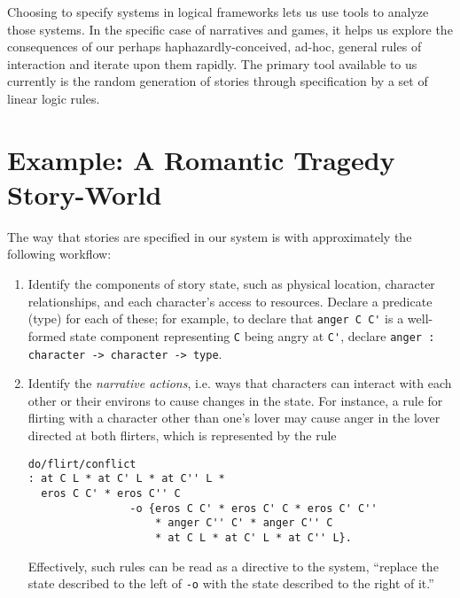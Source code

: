 \documentclass[letterpaper]{article}
\begin{document}
Choosing to specify systems in logical frameworks lets us use tools to
analyze those systems. In the specific case of narratives and games, it
helps us explore the consequences of our perhaps haphazardly-conceived,
ad-hoc, general rules of interaction and iterate upon them rapidly. The
primary tool available to us currently is the random generation of stories
through specification by a set of linear logic rules.


\section{Example: A Romantic Tragedy Story-World}

% 

The way that stories are specified in our system is with approximately the
following workflow:
\begin{enumerate}
\item Identify the components of story state, such as physical location,
character relationships, and each character's access to resources. Declare
a predicate (type) for each of these; for example, to declare that
\verb|anger C C'| is a well-formed state component representing \verb|C|
being angry at \verb|C'|, declare  
\verb|anger : character -> character -> type|.
\item Identify the {\em narrative actions}, i.e. ways that characters can
interact with each other or their environs to cause changes in the state.
For instance, a rule for flirting with a character other than one's lover
may cause anger in the lover directed at both flirters, which is
represented by the rule
\begin{verbatim}
do/flirt/conflict 
: at C L * at C' L * at C'' L *
  eros C C' * eros C'' C
                -o {eros C C' * eros C' C * eros C' C'' 
                    * anger C'' C' * anger C'' C
                    * at C L * at C' L * at C'' L}.
\end{verbatim}
Effectively, such rules can be read as a directive to the system, ``replace
the state described to the left of \verb|-o| with the state described to
the right of it.''
\end{enumerate}
\end{document}

